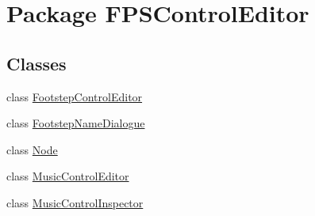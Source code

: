 \hypertarget{namespace_f_p_s_control_editor}{\section{Package F\-P\-S\-Control\-Editor}
\label{namespace_f_p_s_control_editor}
}
\subsection*{Classes}
\begin{DoxyCompactItemize}
\item 
class \hyperlink{class_f_p_s_control_editor_1_1_footstep_control_editor}{Footstep\-Control\-Editor}
\item 
class \hyperlink{class_f_p_s_control_editor_1_1_footstep_name_dialogue}{Footstep\-Name\-Dialogue}
\item 
class \hyperlink{class_f_p_s_control_editor_1_1_node}{Node}
\item 
class \hyperlink{class_f_p_s_control_editor_1_1_music_control_editor}{Music\-Control\-Editor}
\item 
class \hyperlink{class_f_p_s_control_editor_1_1_music_control_inspector}{Music\-Control\-Inspector}
\end{DoxyCompactItemize}
